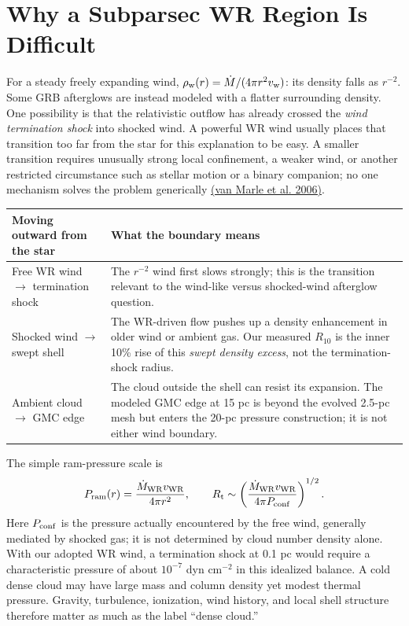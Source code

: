 \documentclass[10pt,letterpaper]{article}
\begin{document}
\clearpage
\section{Why a Subparsec WR Region Is Difficult}
For a steady freely expanding wind, $\rho_{\rm w}(r)=\dot M/(4\pi r^2v_{\rm w})$: its density falls as $r^{-2}$. Some GRB afterglows are instead modeled with a flatter surrounding density. One possibility is that the relativistic outflow has already crossed the \emph{wind termination shock} into shocked wind. A powerful WR wind usually places that transition too far from the star for this explanation to be easy. A smaller transition requires unusually strong local confinement, a weaker wind, or another restricted circumstance such as stellar motion or a binary companion; no one mechanism solves the problem generically \href{https://arxiv.org/abs/astro-ph/0605698}{(van Marle et al. 2006)}.

\begingroup\small\renewcommand{\arraystretch}{1.08}
\begin{tabularx}{\textwidth}{@{}p{}>{\raggedright\arraybackslash}X@{}}
\toprule
Moving outward from the star & What the boundary means \\
\midrule
Free WR wind $\rightarrow$ termination shock & The $r^{-2}$ wind first slows strongly; this is the transition relevant to the wind-like versus shocked-wind afterglow question. \\
Shocked wind $\rightarrow$ swept shell & The WR-driven flow pushes up a density enhancement in older wind or ambient gas. Our measured $R_{10}$ is the inner 10\% rise of this \emph{swept density excess}, not the termination-shock radius. \\
Ambient cloud $\rightarrow$ GMC edge & The cloud outside the shell can resist its expansion. The modeled GMC edge at 15 pc is beyond the evolved 2.5-pc mesh but enters the 20-pc pressure construction; it is not either wind boundary. \\
\bottomrule
\end{tabularx}
\endgroup

The simple ram-pressure scale is
\[
 P_{\rm ram}(r)=\frac{\dot M_{\rm WR}v_{\rm WR}}{4\pi r^2},\qquad
 R_{\rm t}\sim\left(\frac{\dot M_{\rm WR}v_{\rm WR}}{4\pi P_{\rm conf}}\right)^{1/2}.
\]
Here $P_{\rm conf}$ is the pressure actually encountered by the free wind, generally mediated by shocked gas; it is not determined by cloud number density alone. With our adopted WR wind, a termination shock at 0.1 pc would require a characteristic pressure of about $10^{-7}$ dyn cm$^{-2}$ in this idealized balance. A cold dense cloud may have large mass and column density yet modest thermal pressure. Gravity, turbulence, ionization, wind history, and local shell structure therefore matter as much as the label ``dense cloud.''
\end{document}
